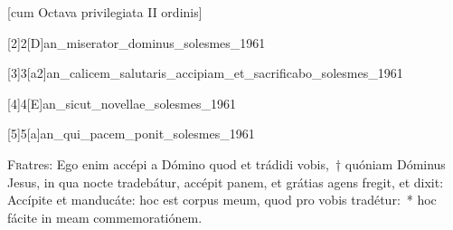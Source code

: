 \documentclass[vesperale_romanum.tex]{subfiles}
\begin{document}


\newpage

\thispagestyle{empty}


\thispagestyle{empty}

[cum Octava privilegiata II ordinis]

 \label{1_vesperis_cc}





[2]{2}[D]{an_miserator_dominus_solesmes_1961}

 
 

[3]{3}[a2]{an_calicem_salutaris_accipiam_et_sacrificabo_solesmes_1961}
\label{115_3a2} 
{}

[4]{4}[E]{an_sicut_novellae_solesmes_1961}
\label{127_4E}
{}

[5]{5}[a]{an_qui_pacem_ponit_solesmes_1961}
\label{147_5}


\lettrine{F}{r}atres: Ego enim accépi a Dómino quod et trádidi vobis,~† quóniam Dóminus Jesus, in qua nocte tradebátur, accépit panem, et grátias agens fregit, et dixit: Accípite et manducáte: hoc est corpus meum, quod pro vobis tradétur:~* hoc fácite in meam commemoratiónem.

 \label{hy_pange_lingua_corpus_christi_solesmes}
\end{document}
